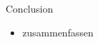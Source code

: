 \begin{frame}{Conclusion}
    \begin{itemize}
        \item zusammenfassen
    \end{itemize}
\end{frame}
